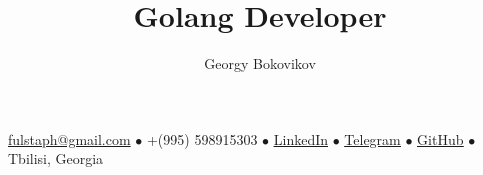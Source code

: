 \documentclass[a4paper,12pt]{article} \raggedright
\makeatletter
\renewcommand{\maketitle}{
    \begin{center}
        {\Large\bfseries\theauthor}
        \vspace{.35em}

        {\bfseries\thetitle}

        \vspace{.25em}

        \underline{fulstaph@gmail.com} {\scriptsize$\bullet$}
        +(995) 598915303 {\scriptsize$\bullet$}
        \href{https://www.linkedin.com/in/bokovikovg/}{\underline{LinkedIn}} {\scriptsize$\bullet$}
        \href{https://t.me/fulstaph}{\underline{Telegram}} {\scriptsize$\bullet$}
        \href{https://github.com/fulstaph}{\underline{GitHub}} {\scriptsize$\bullet$} 
        Tbilisi, Georgia 
    \end{center}
}
\makeatother
\begin{document}
\begin{center}
\author{Georgy Bokovikov}
\end{center}

\title{Golang Developer}
\maketitle






\end{document}
